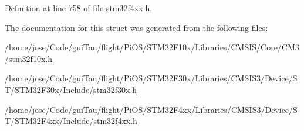 Definition at line 758 of file stm32f4xx.\-h.



The documentation for this struct was generated from the following files\-:\begin{DoxyCompactItemize}
\item 
/home/jose/\-Code/gui\-Tau/flight/\-Pi\-O\-S/\-S\-T\-M32\-F10x/\-Libraries/\-C\-M\-S\-I\-S/\-Core/\-C\-M3/\hyperlink{stm32f10x_8h}{stm32f10x.\-h}\item 
/home/jose/\-Code/gui\-Tau/flight/\-Pi\-O\-S/\-S\-T\-M32\-F30x/\-Libraries/\-C\-M\-S\-I\-S3/\-Device/\-S\-T/\-S\-T\-M32\-F30x/\-Include/\hyperlink{stm32f30x_8h}{stm32f30x.\-h}\item 
/home/jose/\-Code/gui\-Tau/flight/\-Pi\-O\-S/\-S\-T\-M32\-F4xx/\-Libraries/\-C\-M\-S\-I\-S3/\-Device/\-S\-T/\-S\-T\-M32\-F4xx/\-Include/\hyperlink{stm32f4xx_8h}{stm32f4xx.\-h}\end{DoxyCompactItemize}
